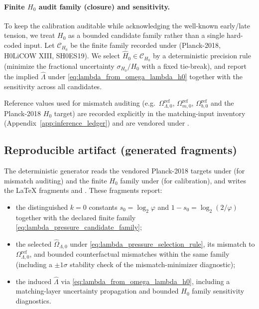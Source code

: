 \paragraph{Finite \texorpdfstring{$H_0$}{H0} audit family (closure) and sensitivity.}
\AuditTag To keep the calibration auditable while acknowledging the well-known early/late tension, we treat $H_0$ as a bounded candidate family rather than a single hard-coded input.
Let $\mathcal{C}_{H_0}$ be the finite family recorded under  (Planck-2018, H0LiCOW XIII, SH0ES19).
We select $\widehat H_0\in\mathcal{C}_{H_0}$ by a deterministic precision rule (minimize the fractional uncertainty $\sigma_{H_0}/H_0$ with a fixed tie-break), and report the implied $\widehat\Lambda$ under \eqref{eq:lambda_from_omega_lambda_h0} together with the sensitivity across all candidates.

\MatchTag Reference values used for mismatch auditing (e.g.\ $\Omega_{\Lambda,0}^{\mathrm{ref}}$, $\Omega_{m,0}^{\mathrm{ref}}$, $\Omega_{b,0}^{\mathrm{ref}}$ and the Planck-2018 $H_0$ target) are recorded explicitly in the matching-input inventory (Appendix~\ref{app:inference_ledger}) and are vendored under .

\subsection{Reproducible artifact (generated fragments)}
\label{subsec:lambda_pressure_generated}

\AuditTag The deterministic generator  reads the vendored Planck-2018 targets under
 (for mismatch auditing) and the finite $H_0$ family under
 (for calibration), and writes the LaTeX fragments
 and
.
These fragments report:
\begin{itemize}
\item the distinguished $k=0$ constants $s_0=\log_2\varphi$ and $1-s_0=\log_2(2/\varphi)$ together with the declared finite family \eqref{eq:lambda_pressure_candidate_family};
\item the selected $\widehat\Omega_{\Lambda,0}$ under \eqref{eq:lambda_pressure_selection_rule}, its mismatch to $\Omega_{\Lambda,0}^{\mathrm{ref}}$, and bounded counterfactual mismatches within the same family (including a $\pm 1\sigma$ stability check of the mismatch-minimizer diagnostic);
\item the induced $\widehat\Lambda$ via \eqref{eq:lambda_from_omega_lambda_h0}, including a matching-layer uncertainty propagation and bounded $H_0$ family sensitivity diagnostics.
\end{itemize}

\[
%
\]

%

